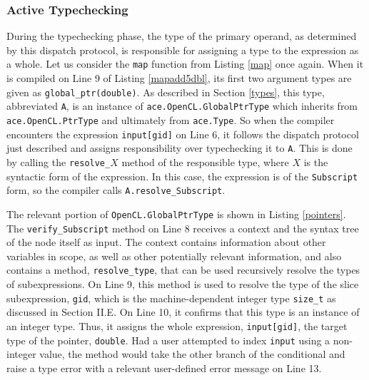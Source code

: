 \documentclass{sig-alternate}
\begin{document}
\subsubsection{Active Typechecking}
During the typechecking phase, the type of the primary operand, as determined by this dispatch protocol, is responsible for assigning a type to the expression as a whole. Let us consider the \verb|map| function from Listing \ref{map} once again. When it is compiled on Line 9 of Listing \ref{mapadd5dbl}, its first two argument types are given as \verb|global_ptr(double)|. As described in Section \ref{types}, this type, abbreviated \verb|A|, is an instance of \verb|ace.OpenCL.GlobalPtrType| which inherits from \verb|ace.OpenCL.PtrType| and ultimately from \verb|ace.Type|. So when the compiler encounters the expression \verb|input[gid]| on Line 6, it follows the dispatch protocol just described and assigns responsibility over typechecking it to \verb|A|. This is done by calling the \verb|resolve_|$X$ method of the responsible type, where $X$ is the syntactic form of the expression. In this case, the expression is of the \verb|Subscript| form, so the compiler calls \verb|A.resolve_Subscript|.

The relevant portion of \verb|OpenCL.GlobalPtrType| is shown in Listing \ref{pointers}. The \verb|verify_Subscript| method on Line 8 receives a context and the syntax tree of the node itself as input. The context contains information about other variables in scope, as well as other potentially relevant information, and also contains a method, \verb|resolve_type|, that can be used recursively resolve the types of subexpressions. On Line 9, this method is used to resolve the type of the slice subexpression, \verb|gid|, which is the machine-dependent integer type \verb|size_t| as discussed in Section II.E. On Line 10, it confirms that this type is an instance of an integer type. Thus, it assigns the whole expression, \verb|input[gid]|, the target type of the pointer, \verb|double|. Had a user attempted to index \verb|input| using a non-integer value, the method would take the other branch of the conditional and raise a type error with a relevant user-defined error message on Line 13.
\end{document}
